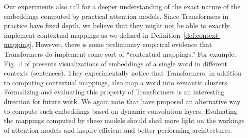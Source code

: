 \documentclass{article} %
\begin{document}

Our experiments also call for a deeper understanding of the exact nature of the embeddings computed by practical attention models.
Since Transformers in practice have fixed depth, we believe that they might not be able to exactly implement contextual mappings as we defined in Definition~\ref{def:context-mapping}. 
However, there is some preliminary empirical evidence that Transformers do implement some sort of ``contextual mappings.'' For example,
Fig.~4 of \citet{coenen2019visualizing} presents visualizations of
embeddings of a single word in different contexts (sentences). They experimentally notice that Transformers, in addition to computing contextual mappings, also map a word into semantic clusters. Formalizing and evaluating this property of Transformers is an interesting direction for future work. We again note that \citet{wu2019pay} have proposed an alternative way to compute such embeddings based on dynamic convolution layers. Evaluating the mappings computed by these models should shed more light on the workings of attention models and inspire efficient and better performing architectures.




%






\newpage
\appendix



\end{document}
